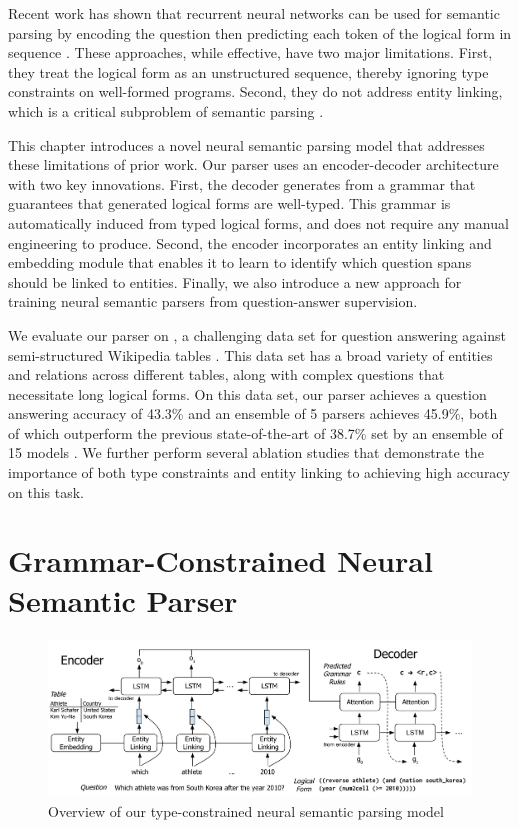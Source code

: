 Recent work has shown that recurrent neural networks can be used for semantic parsing by encoding the question
then predicting each token of the logical form in sequence \cite{jia2016,dong2016}.
These approaches, while effective, have two major limitations.
First, they treat the logical form as an unstructured sequence, thereby ignoring type constraints on well-formed programs.
Second, they do not address entity linking, which is a critical subproblem of semantic parsing \cite{yih2015stagg}.

This chapter introduces a novel neural semantic parsing model that addresses these limitations of prior work.
Our parser uses an encoder-decoder architecture with two key innovations.
First, the decoder generates from a grammar that guarantees that generated logical forms are well-typed.
This grammar is automatically induced from typed logical forms, and does not require any manual engineering to produce. 
Second, the encoder incorporates an entity linking and embedding module that enables it to learn to identify which question spans should be linked to entities.
Finally, we also introduce a new approach for training neural semantic parsers from question-answer supervision.

We evaluate our parser on \WTQ, a challenging data set for question answering against semi-structured Wikipedia tables \cite{pasupat2015}.
This data set has a broad variety of entities and relations across different tables, along with complex questions that necessitate long logical forms.
On this data set, our parser achieves a question answering accuracy of 43.3\% and an ensemble of 5 parsers achieves 45.9\%, both of which outperform the
previous state-of-the-art of 38.7\% set by an ensemble of 15 models \cite{haug2017}. We further perform several ablation studies that demonstrate the
importance of both type constraints and entity linking to achieving high accuracy on this task.

\section{Grammar-Constrained Neural Semantic Parser}
\begin{figure}
\centering
\includegraphics[width=6in]{figures/type_constrained_nnsp.png}
\caption{Overview of our type-constrained neural semantic parsing model}
\label{fig:nnsp_model}
\end{figure}

